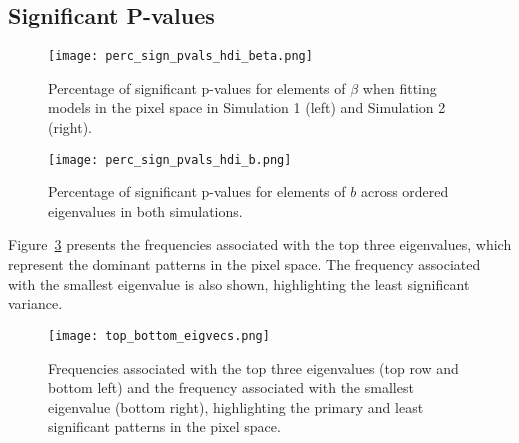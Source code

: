 \documentclass[12pt]{article}
\begin{document}
\FloatBarrier

\subsection*{Significant P-values}

\begin{figure}[h!] 
	\centering
  \texttt{[image: perc\_sign\_pvals\_hdi\_beta.png]} 
  \caption{Percentage of significant p-values for elements of \( \beta \) when fitting models in the pixel space in
  Simulation 1 (left) and Simulation 2 (right).}
	\label{fig:perc_sign_beta} 
\end{figure}

\begin{figure}[h!] 
	\centering
  \texttt{[image: perc\_sign\_pvals\_hdi\_b.png]} 
  \caption{Percentage of significant p-values for elements of \( b \) across ordered eigenvalues in both simulations.}
	\label{fig:perc_sign_b} 
\end{figure}

\FloatBarrier

Figure~\ref*{fig:top_bottom_eigvecs} presents the frequencies associated with the top three eigenvalues, which represent the dominant patterns in the pixel space. The frequency associated with the smallest eigenvalue is also shown, highlighting the least significant variance.

\begin{figure}[h!] 
	\centering
	\texttt{[image: top\_bottom\_eigvecs.png]} 
\caption{Frequencies associated with the top three eigenvalues (top row and bottom left) and the frequency associated with the smallest eigenvalue (bottom right), highlighting the primary and least significant patterns in the pixel space.}
	\label{fig:top_bottom_eigvecs} 
\end{figure}
\end{document}
